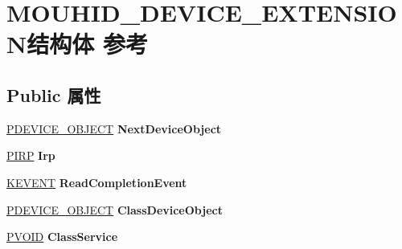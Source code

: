 \hypertarget{struct_m_o_u_h_i_d___d_e_v_i_c_e___e_x_t_e_n_s_i_o_n}{}\section{M\+O\+U\+H\+I\+D\+\_\+\+D\+E\+V\+I\+C\+E\+\_\+\+E\+X\+T\+E\+N\+S\+I\+O\+N结构体 参考}
\label{struct_m_o_u_h_i_d___d_e_v_i_c_e___e_x_t_e_n_s_i_o_n}
\subsection*{Public 属性}
\begin{DoxyCompactItemize}
\item 
\mbox{\label{struct_m_o_u_h_i_d___d_e_v_i_c_e___e_x_t_e_n_s_i_o_n_aa053eaa41bd28dc2ccbd396290e25f5d}} 
\hyperlink{struct___d_e_v_i_c_e___o_b_j_e_c_t}{P\+D\+E\+V\+I\+C\+E\+\_\+\+O\+B\+J\+E\+CT} {\bfseries Next\+Device\+Object}
\item 
\mbox{\label{struct_m_o_u_h_i_d___d_e_v_i_c_e___e_x_t_e_n_s_i_o_n_a03d41cb46d9285c87e87a1e3d5411a7f}} 
\hyperlink{interfacevoid}{P\+I\+RP} {\bfseries Irp}
\item 
\mbox{\label{struct_m_o_u_h_i_d___d_e_v_i_c_e___e_x_t_e_n_s_i_o_n_af8d47443fef73f8a229f3cf4348621c7}} 
\hyperlink{struct___k_e_v_e_n_t}{K\+E\+V\+E\+NT} {\bfseries Read\+Completion\+Event}
\item 
\mbox{\label{struct_m_o_u_h_i_d___d_e_v_i_c_e___e_x_t_e_n_s_i_o_n_a96af4b58b082438e6bc2fc64d29c7fa8}} 
\hyperlink{struct___d_e_v_i_c_e___o_b_j_e_c_t}{P\+D\+E\+V\+I\+C\+E\+\_\+\+O\+B\+J\+E\+CT} {\bfseries Class\+Device\+Object}
\item 
\mbox{\label{struct_m_o_u_h_i_d___d_e_v_i_c_e___e_x_t_e_n_s_i_o_n_a2d9369f07e326d96d9b9f8d2e689f687}} 
\hyperlink{interfacevoid}{P\+V\+O\+ID} {\bfseries Class\+Service}
\item 
\mbox{\label{struct_m_o_u_h_i_d___d_e_v_i_c_e___e_x_t_e_n_s_i_o_n_a1f5ecece1fadaa1141917c3be45eab18}} 

\end{DoxyCompactItemize}
